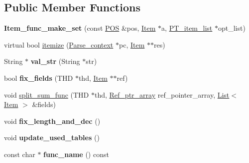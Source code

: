 \subsection*{Public Member Functions}
\begin{DoxyCompactItemize}
\item 
\mbox{\label{classItem__func__make__set_a0603d5b61acdcac2ff3f240fcd91b22b}} 
{\bfseries Item\+\_\+func\+\_\+make\+\_\+set} (const \mbox{\hyperlink{structYYLTYPE}{P\+OS}} \&pos, \mbox{\hyperlink{classItem}{Item}} $\ast$a, \mbox{\hyperlink{classPT__item__list}{P\+T\+\_\+item\+\_\+list}} $\ast$opt\+\_\+list)
\item 
virtual bool \mbox{\hyperlink{classItem__func__make__set_a5b2e80cd013122c3a7bed4582b75456f}{itemize}} (\mbox{\hyperlink{structParse__context}{Parse\+\_\+context}} $\ast$pc, \mbox{\hyperlink{classItem}{Item}} $\ast$$\ast$res)
\item 
\mbox{\label{classItem__func__make__set_a1282a590a09b279a50f0ab6bdd90319e}} 
String $\ast$ {\bfseries val\+\_\+str} (String $\ast$str)
\item 
\mbox{\label{classItem__func__make__set_a1ac8e4463472204062504c52ad689d8b}} 
bool {\bfseries fix\+\_\+fields} (T\+HD $\ast$thd, \mbox{\hyperlink{classItem}{Item}} $\ast$$\ast$ref)
\item 
void \mbox{\hyperlink{classItem__func__make__set_a0861efd2c2bac3164cfd61888040a092}{split\+\_\+sum\+\_\+func}} (T\+HD $\ast$thd, \mbox{\hyperlink{classBounds__checked__array}{Ref\+\_\+ptr\+\_\+array}} ref\+\_\+pointer\+\_\+array, \mbox{\hyperlink{classList}{List}}$<$ \mbox{\hyperlink{classItem}{Item}} $>$ \&fields)
\item 
\mbox{\label{classItem__func__make__set_a671b37dccb02cc887aca23ae634b417d}} 
void {\bfseries fix\+\_\+length\+\_\+and\+\_\+dec} ()
\item 
\mbox{\label{classItem__func__make__set_a5eef95aace46dcd3df4fe7526cd0185b}} 
void {\bfseries update\+\_\+used\+\_\+tables} ()
\item 
\mbox{\label{classItem__func__make__set_a0a57740d0808c484f065181d184e1e3d}} 
const char $\ast$ {\bfseries func\+\_\+name} () const

\end{DoxyCompactItemize}
